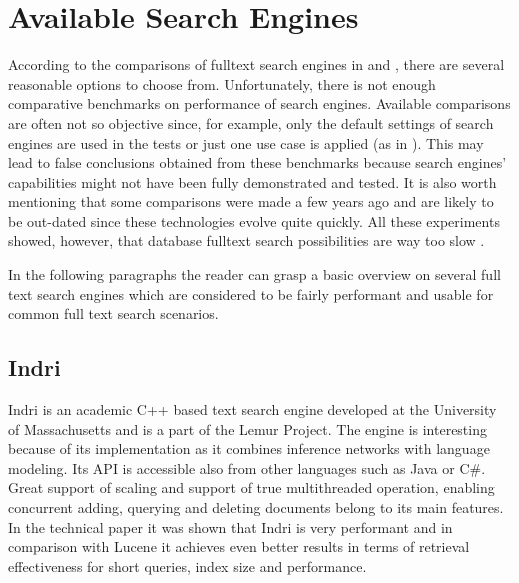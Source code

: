 \chapter{Available Search Engines}
\label{chap:engines}





According to the comparisons of fulltext search engines in \cite{MiddletonBaeza} and \cite{SinghSearchEngines}, there are several reasonable options to choose from. 
Unfortunately, there is not enough comparative benchmarks on performance of search engines. Available comparisons are often not so objective since, for example, only the default settings of search engines are used in the tests or just one use case is applied
(as in \cite{SinghSearchEngines}). 
This may lead to false conclusions obtained from these benchmarks because search engines' capabilities might not have been fully demonstrated and tested. 
It is also worth mentioning that some comparisons were made a few years ago and are likely to be out-dated since these technologies evolve quite quickly.
All these experiments showed, however, that database fulltext search possibilities are way too slow \cite{BenchmarkLuceneRelDB,BenchmarkMysqlLuceneSphinx}.

In the following paragraphs the reader can grasp a basic overview on several full text search engines which are considered to be fairly
performant and usable for common full text search scenarios.


\section{Indri}

Indri \cite{IndriHome} is an academic C++ based text search engine
developed at the University of Massachusetts and is a part of the
Lemur Project. The engine is interesting because of its implementation
as it combines inference networks with language modeling. Its API
is accessible also from other languages such as Java or C\#. Great
support of scaling and support of true multithreaded operation, enabling
concurrent adding, querying and deleting documents belong to its main
features. In the technical paper \cite{ComparisonLuceneIndri}
it was shown that Indri is very performant and in comparison with
Lucene it achieves even better results in terms of retrieval effectiveness
for short queries, index size and performance.



